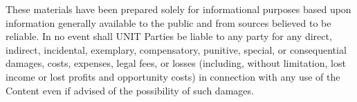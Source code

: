 \documentclass[12pt]{article}
\begin{document}
These materials have been prepared solely for informational purposes based upon information generally available to the public and from sources believed to be reliable. In no event shall UNIT Parties be liable to any party for any direct, indirect, incidental, exemplary, compensatory, punitive, special, or consequential damages, costs, expenses, legal fees, or losses (including, without limitation, lost income or lost profits and opportunity costs) in connection with any use of the Content even if advised of the possibility of such damages.
\end{document}
